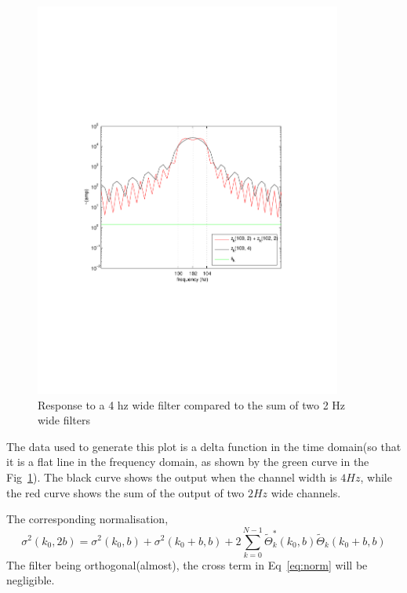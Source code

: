 \begin{figure}
\begin{center}
\includegraphics[width=0.9\textwidth]{figures/sumoffilters}
\caption{Response to a 4 hz wide filter compared to the sum of two 2 Hz wide filters}
\label{fig:sumfilters}
\end{center}
\end{figure}
The data used to generate this plot is a delta function in the time domain(so that 
it is a flat line in the frequency domain, as shown by the green curve in the Fig~\ref{fig:sumfilters}).
The black curve shows the output when the channel width is $4 Hz$, while the red curve 
shows the sum of the output of two $2 Hz$ wide channels. 


The corresponding normalisation,  
\begin{equation}
\sigma^2(k_0,  2b) = \sigma^2(k_0,  b) + \sigma^2(k_0+b,  b) + 2\sum_{k=0}^{N-1}\tilde{\Theta}_k^\ast(k_0,  b)\tilde{\Theta}_k(k_0 + b,  b)
\label{eq:norm}
\end{equation}
The filter being orthogonal(almost),  the cross term in Eq~\ref{eq:norm} will be negligible.  

